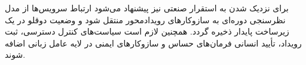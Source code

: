 \documentclass[a4paper,fleqn]{report}
\begin{document}
برای نزدیک شدن به استقرار صنعتی نیز پیشنهاد می‌شود ارتباط سرویس‌ها از مدل نظرسنجی دوره‌ای به سازوکارهای رویدادمحور منتقل شود و وضعیت دوقلو در یک زیرساخت پایدار ذخیره گردد. همچنین لازم است سیاست‌های کنترل دسترسی، ثبت رویداد، تأیید انسانی فرمان‌های حساس و سازوکارهای ایمنی در لایه عامل زبانی اضافه شوند.








\end{document}
